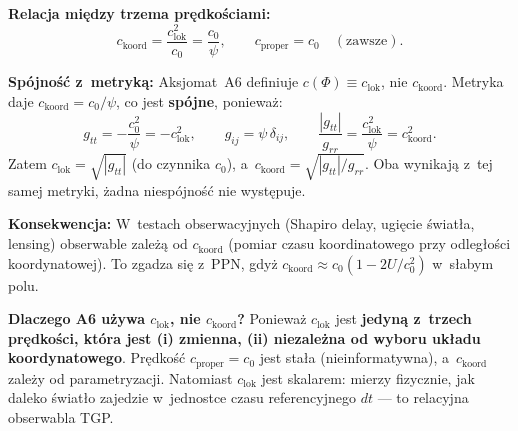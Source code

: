 \begin{remark}
\noindent\textbf{Relacja między trzema prędkościami:}
\begin{equation}\label{eq:three-c-relation}
  \boxed{
    c_{\mathrm{koord}} = \frac{c_{\mathrm{lok}}^2}{c_0}
    = \frac{c_0}{\psi},
    \qquad
    c_{\mathrm{proper}} = c_0
    \quad (\text{zawsze}).
  }
\end{equation}

\noindent\textbf{Spójność z~metryką:}
Aksjomat~A6 definiuje $c(\Phi) \equiv c_{\mathrm{lok}}$,
nie $c_{\mathrm{koord}}$.
Metryka daje $c_{\mathrm{koord}} = c_0/\psi$,
co jest \textbf{spójne}, ponieważ:
\begin{equation}
  g_{tt} = -\frac{c_0^2}{\psi} = -c_{\mathrm{lok}}^2,
  \qquad
  g_{ij} = \psi\,\delta_{ij},
  \qquad
  \frac{|g_{tt}|}{g_{rr}} = \frac{c_{\mathrm{lok}}^2}{\psi}
  = c_{\mathrm{koord}}^2.
\end{equation}
Zatem $c_{\mathrm{lok}} = \sqrt{|g_{tt}|}$ (do czynnika $c_0$),
a~$c_{\mathrm{koord}} = \sqrt{|g_{tt}|/g_{rr}}$. Oba wynikają
z~tej samej metryki, żadna niespójność nie występuje.

\medskip
\noindent\textbf{Konsekwencja:} W~testach obserwacyjnych
(Shapiro delay, ugięcie światła, lensing) obserwable zależą
od $c_{\mathrm{koord}}$ (pomiar czasu koordinatowego przy
odległości koordynatowej). To zgadza się z~PPN, gdyż
$c_{\mathrm{koord}} \approx c_0(1 - 2U/c_0^2)$
w~słabym polu.

\medskip
\noindent\textbf{Dlaczego A6 używa $c_{\mathrm{lok}}$, nie $c_{\mathrm{koord}}$?}
Ponieważ $c_{\mathrm{lok}}$ jest \textbf{jedyną
z~trzech prędkości, która jest (i) zmienna, (ii) niezależna
od wyboru układu koordynatowego}. Prędkość $c_{\mathrm{proper}} = c_0$
jest stała (nieinformatywna), a~$c_{\mathrm{koord}}$ zależy
od parametryzacji. Natomiast $c_{\mathrm{lok}}$ jest
skalarem: mierzy fizycznie, jak daleko światło zajedzie
w~jednostce czasu referencyjnego $dt$ --- to relacyjna
obserwabla TGP.
\end{remark}

